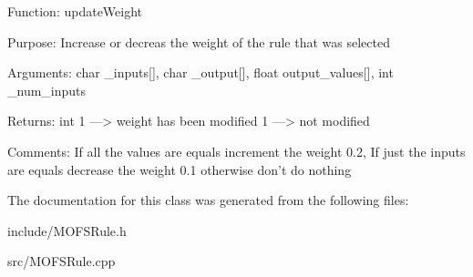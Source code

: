  Function\-: update\-Weight 

\begin{DoxyVerb}Purpose:    Increase or decreas the weight of the rule that was selected

Arguments:  char _inputs[], char _output[], float output_values[], int _num_inputs

Returns:    int  1  --->    weight has been modified
                 1  --->    not modified

Comments:   If all the values are equals increment the weight 0.2,
            If just the inputs are equals decrease the weight 0.1
            otherwise don't do nothing
\end{DoxyVerb}
 

 

The documentation for this class was generated from the following files\-:\begin{DoxyCompactItemize}
\item 
include/M\-O\-F\-S\-Rule.\-h\item 
src/M\-O\-F\-S\-Rule.\-cpp\end{DoxyCompactItemize}
